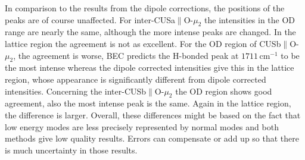 \documentclass[11pt,DIV=13,BCOR=5mm,a4paper,headinclude]{scrbook}
\begin{document}
In comparison to the results from the dipole corrections, the positions of the peaks are of course unaffected.
For inter-CUSa$\parallel$O-$\mu_2$ the intensities in the OD range are nearly the same, although the more intense peaks are changed.
In the lattice region the agreement is not as excellent.
For the OD region of CUSb$\parallel$O-$\mu_2$, the agreement is worse, BEC predicts the H-bonded peak at $1711\,$cm$^{-1}$ to be the most intense whereas the dipole corrected intensities give this in the lattice region, whose appearance is significantly different from dipole corrected intensities.
Concerning the inter-CUSb$\parallel$O-$\mu_2$ the OD region shows good agreement, also the most intense peak is the same.
Again in the lattice region, the difference is larger.
Overall, these differences might be based on the fact that low energy modes are less precisely represented by normal modes and both methods give low quality results.
Errors can compensate or add up so that there is much uncertainty in those results.
\end{document}
